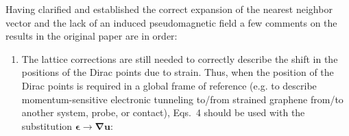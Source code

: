 Having clarified and established the correct expansion of the nearest neighbor vector and the lack of an induced pseudomagnetic field a few comments on the results in the original paper are in order:
%
\begin{enumerate} \renewcommand{\theenumi}{\roman{enumi}}
  \item The lattice corrections are still needed to correctly describe the shift in the positions of the Dirac points due to strain. Thus, when the position of the Dirac points is required in a global frame of reference (e.g. to describe momentum-sensitive electronic tunneling to/from strained graphene from/to another system, probe, or contact), Eqs.~4 should be used with the substitution $\bm{\epsilon } \to \bm{\nabla u}$:

\end{enumerate}